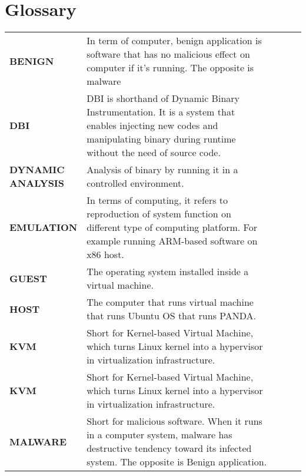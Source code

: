 
\chapter*{Glossary}
\label{chap:glosarry}
\thispagestyle{fancy}

 \begin{table}[ht!]
	\centering
	\footnotesize
	\renewcommand{\arraystretch}{2}
	\label{tab:glossary}
	\vspace{2mm}
	\begin{tabular*}{1.0\textwidth}{@{}p{0.16\linewidth}*{4}{p{0.8\linewidth}}}
		\textbf{BENIGN} & In term of computer, benign application is software that has no malicious effect on computer if it's running. The opposite is malware \\
		
		\textbf{DBI} & DBI is shorthand of Dynamic Binary Instrumentation. It is a system that enables injecting new codes and manipulating binary during runtime without the need of source code. \\
		
		\textbf{DYNAMIC ANALYSIS} & Analysis of binary by running it in a controlled environment. \\
		
		\textbf{EMULATION} & In terms of computing, it refers to  reproduction of system function on different type of computing platform. For example running ARM-based software on x86 host. \\
		
		\textbf{GUEST} & The operating system installed inside a virtual machine. \\
		
		\textbf{HOST} & The computer that runs virtual machine that runs Ubuntu OS that runs PANDA. \\
		
		\textbf{KVM} & Short for Kernel-based Virtual Machine, which turns Linux kernel into a hypervisor in virtualization infrastructure. \\
		
		\textbf{KVM} & Short for Kernel-based Virtual Machine, which turns Linux kernel into a hypervisor in virtualization infrastructure. \\
		
		\textbf{MALWARE} & Short for malicious software. When it runs in a computer system, malware has destructive tendency toward its infected system. The opposite is Benign application. \\
		

\end{tabular*}
\end{table}
